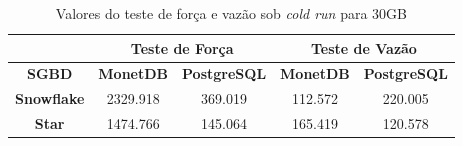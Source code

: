 \begin{table}[htpb]
        \centering
        \caption{Valores do teste de força e vazão sob \textit{cold run} para 30GB}
        \label{tab:forca_vazao_cold_30}
        \begin{tabular}{|c|c|c|c|c|} 
                \cline{2-5}
                \multicolumn{1}{c|}{} & \multicolumn{2}{c|}{\textbf{Teste de Força} } & \multicolumn{2}{c|}{\textbf{Teste de Vazão} }  \\ 
                \hline
                 \textbf{SGBD}        & \textbf{MonetDB}  & \textbf{PostgreSQL}       & \textbf{MonetDB}  & \textbf{PostgreSQL}        \\ 
                \hline
                 \textbf{Snowflake}   & 2329.918          & 369.019                   & 112.572           & 220.005                    \\ 
                \hline
                 \textbf{Star}        & 1474.766          & 145.064                   & 165.419           & 120.578                    \\
                \hline
                \end{tabular}
                \end{table}

